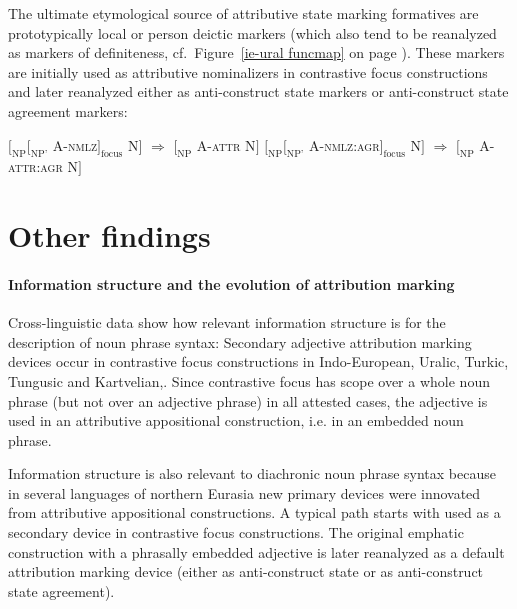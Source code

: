 The ultimate etymological source of attributive state marking formatives are prototypically local or person deictic markers (which also tend to be reanalyzed as markers of definiteness, cf.~Figure~\ref{ie-ural funcmap} on page \pageref{ie-ural funcmap}). These markers are initially used as attributive nominalizers in contrastive focus constructions and later reanalyzed either as anti\hyp{}construct state markers or anti\hyp{}construct state agreement markers:
\begin{exe}
\ex
\begin{xlist}
\ex \rm{$[_{\text{NP}} [_{\text{NP'}}$ A-\textsc{nmlz}$]_{\text{focus}}$ N$]$ $\Rightarrow$ $[_{\text{NP}}$ A-\textsc{attr} N$]$}
\ex \rm{$[_{\text{NP}} [_{\text{NP'}}$ A-\textsc{nmlz:agr}$]_{\text{focus}}$ N$]$ $\Rightarrow$ $[_{\text{NP}}$ A-\textsc{attr:agr} N$]$}
\end{xlist}
\end{exe}

\section{Other findings}
\paragraph*{Information structure and the evolution of attribution marking} Cross\hyp{}linguistic data show how relevant information structure is for the description of noun phrase syntax: Secondary adjective attribution marking devices occur in contrastive focus constructions in Indo-European, Uralic, Turkic, Tungusic and Kartvelian,. Since contrastive focus has scope over a whole noun phrase (but not over an adjective phrase) in all attested cases, the adjective is used in an attributive appositional construction, i.e. in an embedded noun phrase.

Information structure is also relevant to diachronic noun phrase syntax because in several languages of northern Eurasia new primary devices were innovated from attributive appositional constructions. A typical  path starts with  used as a secondary device in contrastive focus constructions. The original emphatic construction with a phrasally embedded adjective is later reanalyzed as a default attribution marking device (either as anti\hyp{}construct state or as anti\hyp{}construct state agreement).

